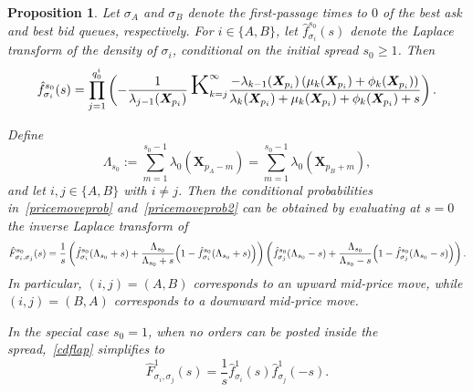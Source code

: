 \documentclass[11pt]{article}
\newtheorem{proposition}{Proposition}
\begin{document}
\begin{proposition}\label{proppricemove}
Let $\sigma_A$ and $\sigma_B$ denote the first-passage times to $0$ of the best ask and best bid queues, respectively. For $i\in\{A,B\}$, let $\hat{f}^{s_0}_{\sigma_i}(s)$ denote the Laplace transform of the density of $\sigma_i$, conditional on the initial spread $s_0\geq 1$. Then
\begin{equation}\label{FPTtransform}
\hat{f}^{s_0}_{\sigma_i}(s)
=
\prod_{j=1}^{q_0^i}
\left(
-\frac{1}{\lambda_{j-1}(\boldsymbol{X}_{p_i})}
\,\text{\textup{\huge K}}_{k=j}^\infty
\frac{-\lambda_{k-1}(\boldsymbol{X}_{p_i})
\left(\mu_k(\boldsymbol{X}_{p_i})+\phi_k(\boldsymbol{X}_{p_i})\right)}
{\lambda_k(\boldsymbol{X}_{p_i})+\mu_k(\boldsymbol{X}_{p_i})+\phi_k(\boldsymbol{X}_{p_i})+s}
\right).
\end{equation}

Define
\[
\Lambda_{s_0}
:=
\sum_{m=1}^{s_0-1}\lambda_0(\boldsymbol{X}_{p_A-m})
=
\sum_{m=1}^{s_0-1}\lambda_0(\boldsymbol{X}_{p_B+m}),
\]
and let $i,j\in\{A,B\}$ with $i\neq j$. Then the conditional probabilities in~\eqref{pricemoveprob} and~\eqref{pricemoveprob2} can be obtained by evaluating at $s=0$ the inverse Laplace transform of
\begin{equation}\label{cdflap}
\hat{F}^{s_0}_{\sigma_i,\sigma_j}(s)
=
\frac{1}{s}
\left(
\hat{f}^{s_0}_{\sigma_i}(\Lambda_{s_0}+s)
+
\frac{\Lambda_{s_0}}{\Lambda_{s_0}+s}
\Bigl(1-\hat{f}^{s_0}_{\sigma_i}(\Lambda_{s_0}+s)\Bigr)
\right)
\left(
\hat{f}^{s_0}_{\sigma_j}(\Lambda_{s_0}-s)
+
\frac{\Lambda_{s_0}}{\Lambda_{s_0}-s}
\Bigl(1-\hat{f}^{s_0}_{\sigma_j}(\Lambda_{s_0}-s)\Bigr)
\right).
\end{equation}
In particular, $(i,j)=(A,B)$ corresponds to an upward mid-price move, while $(i,j)=(B,A)$ corresponds to a downward mid-price move.

In the special case $s_0=1$, when no orders can be posted inside the spread,~\eqref{cdflap} simplifies to
\begin{equation}\label{LTcdfpricemove}
\hat{F}^{1}_{\sigma_i,\sigma_j}(s)
=
\frac{1}{s}\hat{f}^{1}_{\sigma_i}(s)\hat{f}^{1}_{\sigma_j}(-s).
\end{equation}
\end{proposition}
\end{document}

